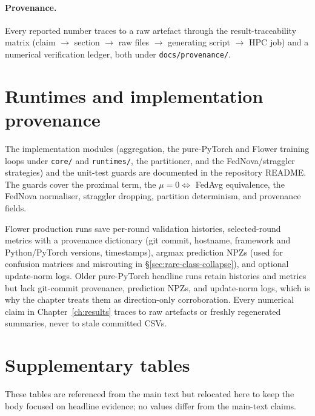 \documentclass[11pt,a4paper]{report}
\begin{document}
\paragraph{Provenance.}
Every reported number traces to a raw artefact through the result-traceability
matrix (claim $\rightarrow$ section $\rightarrow$ raw files $\rightarrow$ generating
script $\rightarrow$ HPC job) and a numerical verification ledger, both under
\texttt{docs/provenance/}.

\section{Runtimes and implementation provenance}
\label{app:provenance}

The implementation modules (aggregation, the pure-PyTorch and Flower training
loops under \texttt{core/} and \texttt{runtimes/}, the partitioner, and the
FedNova/straggler strategies) and the unit-test guards are documented in the
repository README. The guards cover the proximal term, the
$\mu = 0 \Leftrightarrow$ FedAvg equivalence, the FedNova normaliser, straggler
dropping, partition determinism, and provenance fields.

Flower production runs save per-round validation histories, selected-round metrics
with a provenance dictionary (git commit, hostname, framework and Python/PyTorch
versions, timestamps), argmax prediction NPZs (used for confusion matrices and
misrouting in §\ref{sec:rare-class-collapse}), and optional update-norm logs.
Older pure-PyTorch headline runs retain histories and metrics but lack git-commit
provenance, prediction NPZs, and update-norm logs, which is why the chapter treats
them as direction-only corroboration. Every numerical claim in
Chapter~\ref{ch:results} traces to raw artefacts or freshly regenerated summaries,
never to stale committed CSVs.

\section{Supplementary tables}
\label{app:supp-tables}

These tables are referenced from the main text but relocated here to keep the
body focused on headline evidence; no values differ from the main-text claims.
\end{document}
